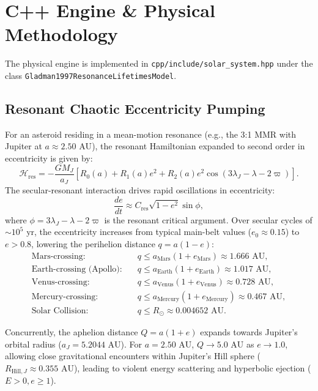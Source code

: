 \documentclass[11pt,a4paper]{article}
\begin{document}
\section{C++ Engine \& Physical Methodology}
The physical engine is implemented in \texttt{cpp/include/solar\_system.hpp} under the class \linebreak \texttt{Gladman1997ResonanceLifetimesModel}.

\subsection{Resonant Chaotic Eccentricity Pumping}
For an asteroid residing in a mean-motion resonance (e.g., the 3:1 MMR with Jupiter at $a \approx 2.50\text{ AU}$), the resonant Hamiltonian expanded to second order in eccentricity is given by:
\begin{equation}
\mathcal{H}_{\text{res}} = -\frac{G M_J}{a_J} \left[ R_0(a) + R_1(a) e^2 + R_2(a) e^2 \cos(3\lambda_J - \lambda - 2\varpi) \right].
\end{equation}
The secular-resonant interaction drives rapid oscillations in eccentricity:
\begin{equation}
\frac{de}{dt} \approx C_{\text{res}} \sqrt{1 - e^2} \sin \phi,
\end{equation}
where $\phi = 3\lambda_J - \lambda - 2\varpi$ is the resonant critical argument. Over secular cycles of $\sim 10^5\text{ yr}$, the eccentricity increases from typical main-belt values ($e_0 \approx 0.15$) to $e > 0.8$, lowering the perihelion distance $q = a(1-e)$:
\begin{align}
\text{Mars-crossing:} \quad & q \le a_{\text{Mars}}(1 + e_{\text{Mars}}) \approx 1.666\text{ AU}, \\
\text{Earth-crossing (Apollo):} \quad & q \le a_{\text{Earth}}(1 + e_{\text{Earth}}) \approx 1.017\text{ AU}, \\
\text{Venus-crossing:} \quad & q \le a_{\text{Venus}}(1 + e_{\text{Venus}}) \approx 0.728\text{ AU}, \\
\text{Mercury-crossing:} \quad & q \le a_{\text{Mercury}}(1 + e_{\text{Mercury}}) \approx 0.467\text{ AU}, \\
\text{Solar Collision:} \quad & q \le R_\odot \approx 0.004652\text{ AU}.
\end{align}

Concurrently, the aphelion distance $Q = a(1+e)$ expands towards Jupiter's orbital radius ($a_J = 5.2044\text{ AU}$). For $a = 2.50\text{ AU}$, $Q \to 5.0\text{ AU}$ as $e \to 1.0$, allowing close gravitational encounters within Jupiter's Hill sphere ($R_{\text{Hill},J} \approx 0.355\text{ AU}$), leading to violent energy scattering and hyperbolic ejection ($E > 0, e \ge 1$).
\end{document}
